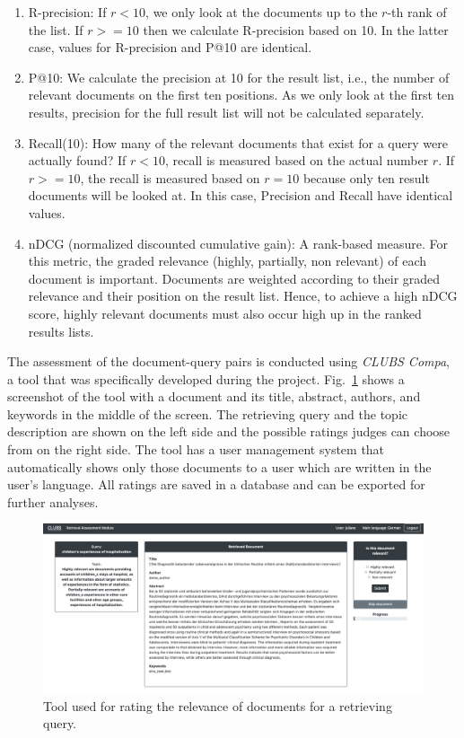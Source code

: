 \documentclass[a4paper,11pt]{article}
\begin{document}
\begin{enumerate}
\item R-precision: If $r < 10$, we only look at the documents up to the $r$-th rank of the list. If $r >= 10$ then we calculate R-precision based on 10. In the latter case, values for R-precision and P@10 are identical.
\item P@10: We calculate the precision at 10 for the result list, i.e., the number of relevant documents on the first ten positions. As we only look at the first ten results, precision for the full result list will not be calculated separately.
\item Recall(10): How many of the relevant documents that exist for a query were actually found? If $r < 10$, recall is measured based on the actual number $r$. If $r >= 10$, the recall is measured based on $r = 10$ because only ten result documents will be looked at. In this case, Precision and Recall have identical values.
\item nDCG (normalized discounted cumulative gain): A rank-based measure. For this metric, the graded relevance (highly, partially, non relevant) of each document is important. Documents are weighted according to their graded relevance and their position on the result list. Hence, to achieve a high nDCG score, highly relevant documents must also occur high up in the ranked results lists.
\end{enumerate}
    
The assessment of the document-query pairs is conducted using \textit{CLUBS Compa}, a tool that was specifically developed during the project. Fig.~\ref{fig:tool} shows a screenshot of the tool with a document and its title, abstract, authors, and keywords in the middle of the screen. The retrieving query and the topic description are shown on the left side and the possible ratings judges can choose from on the right side. The tool has a user management system that automatically shows only those documents to a user which are written in the user's language. All ratings are saved in a database and can be exported for further analyses.

\begin{figure}[hb]
\centering
\includegraphics[width=14cm]{./img/screenshot_tool.png}
\caption{Tool used for rating the relevance of documents for a retrieving query.}
\label{fig:tool}
\end{figure}
\end{document}

